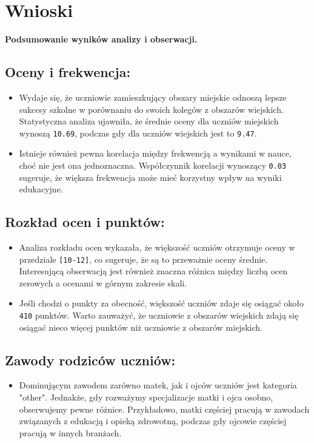 \documentclass{article}
\begin{document}
\section{Wnioski}
\textbf{Podsumowanie wyników analizy i obserwacji.}
\subsection{Oceny i frekwencja:}
\begin{itemize}
    \item Wydaje się, że uczniowie zamieszkujący obszary miejskie odnoszą lepsze sukcesy szkolne w porównaniu do swoich kolegów z obszarów wiejskich. Statystyczna analiza ujawniła, że średnie oceny dla uczniów miejskich wynoszą \texttt{10.69}, podczas gdy dla uczniów wiejskich jest to \texttt{9.47}.
    \item Istnieje również pewna korelacja między frekwencją a wynikami w nauce, choć nie jest ona jednoznaczna. Współczynnik korelacji wynoszący \texttt{0.03} sugeruje, że większa frekwencja może mieć korzystny wpływ na wyniki edukacyjne.
\end{itemize}
\subsection{Rozkład ocen i punktów:}
\begin{itemize}
    \item Analiza rozkładu ocen wykazała, że większość uczniów otrzymuje oceny w przedziale \texttt{[10-12]}, co sugeruje, że są to przeważnie oceny średnie. Interesującą obserwacją jest również znaczna różnica między liczbą ocen zerowych a ocenami w górnym zakresie skali.
    \item Jeśli chodzi o punkty za obecność, większość uczniów zdaje się osiągać około \texttt{410} punktów. Warto zauważyć, że uczniowie z obszarów wiejskich zdają się osiągać nieco więcej punktów niż uczniowie z obszarów miejskich.
\end{itemize}
\subsection{Zawody rodziców uczniów:}
\begin{itemize}
    \item Dominującym zawodem zarówno matek, jak i ojców uczniów jest kategoria "other". Jednakże, gdy rozważymy specjalizacje matki i ojca osobno, obserwujemy pewne różnice. Przykładowo, matki częściej pracują w zawodach związanych z edukacją i opieką zdrowotną, podczas gdy ojcowie częściej pracują w innych branżach.
\end{itemize}
\end{document}
